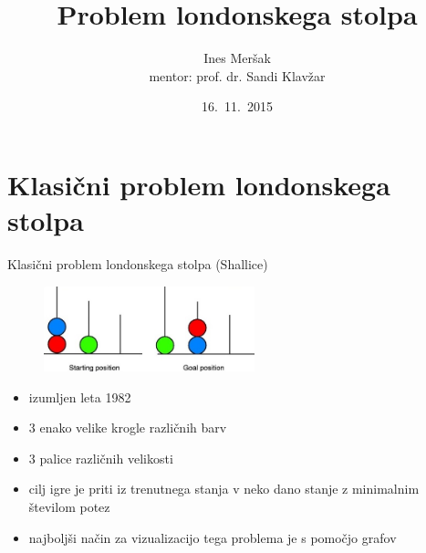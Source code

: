 \documentclass{beamer}
\title{Problem londonskega stolpa}
\author[Ines Meršak]{Ines Meršak \\[5px] mentor: prof. dr. Sandi Klavžar}
\date{16.~11.~2015}
\begin{document}
    
\begin{frame}[plain]
    \titlepage
\end{frame}


\section{Klasični problem londonskega stolpa}
\begin{frame}{Klasični problem londonskega stolpa (Shallice)}
    \begin{figure}
        \centering
        \includegraphics[height=70pt]{img/tol.jpg}
    \end{figure}
    \begin{itemize}
        \item izumljen leta 1982
        \item 3 enako velike krogle različnih barv
        \item 3 palice različnih velikosti
        \item cilj igre je priti iz trenutnega stanja v neko dano stanje z minimalnim številom potez
        \item najboljši način za vizualizacijo tega problema je s pomočjo grafov
    \end{itemize}
\end{frame}
\end{document}
